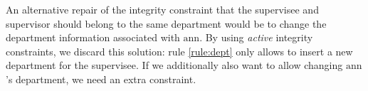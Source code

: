 \documentclass[runningheads]{llncs}
\begin{document}
\begin{example}
  An alternative repair of the integrity constraint that the supervisee and supervisor should belong to the same department would be to change the department information associated with $\mathrm{ann}$. 
  By using \emph{active} integrity constraints, we discard this solution: rule \eqref{rule:dept} only allows to insert a new department for the supervisee. 
  If we additionally also want to allow changing $\mathrm{ann}$'s department, we need an extra constraint. 
\end{example}	

\end{document}
